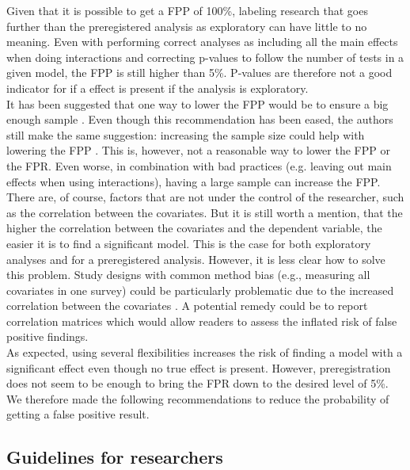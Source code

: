 Given that it is possible to get a FPP of 100\%, labeling research that goes further than the preregistered analysis as exploratory can have little to no meaning. Even with performing correct analyses as including all the main effects when doing interactions and correcting p-values to follow the number of tests in a given model, the FPP is still higher than 5\%. P-values are therefore not a good indicator for if a effect is present if the analysis is exploratory. \\
    
It has been suggested that one way to lower the FPP would be to ensure a big enough sample \citep{Simmons2011}. Even though this recommendation has been eased, the authors still make the same suggestion: increasing the sample size could help with lowering the FPP \cite{simmons2018}. This is, however, not a reasonable way to lower the FPP or the FPR. Even worse, in combination with bad practices (e.g. leaving out main effects when using interactions), having a large sample can increase the FPP. \\

There are, of course, factors that are not under the control of the researcher, such as the correlation between the covariates. But it is still worth a mention, that the higher the correlation between the covariates and the dependent variable, the easier it is to find a significant model. This is the case for both exploratory analyses and for a preregistered analysis. However, it is less clear how to solve this problem. Study designs with common method bias (e.g., measuring all covariates in one survey) could be particularly problematic due to  the increased correlation between the covariates \citep{podsakoff2003}. A potential remedy could be to report correlation matrices which would allow readers to assess the inflated risk of false positive findings.  \\ 

As expected, using several flexibilities increases the risk of finding a model with a significant effect even though no true effect is present. However, preregistration does not seem to be enough to bring the FPR down to the desired level of 5\%. We therefore made the following recommendations to reduce the probability of getting a false positive result. 

\subsection{Guidelines for researchers}

